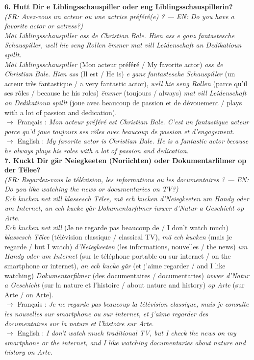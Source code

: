 \noindent\textbf{6. Hutt Dir e Liblingsschauspiller oder eng Liblingsschauspillerin?}\\
\textit{(FR: Avez-vous un acteur ou une actrice préféré(e) ? — EN: Do you have a favorite actor or actress?)}\\[0.3em]
\textit{Mäi Liblingsschauspiller ass de Christian Bale. Hien ass e ganz fantastesche Schauspiller, well hie seng Rollen ëmmer mat vill Leidenschaft an Dedikatioun spillt.}\\
\textit{Mäi Liblingsschauspiller} (Mon acteur préféré / My favorite actor) \textit{ass de Christian Bale}. \textit{Hien ass} (Il est / He is) \textit{e ganz fantastesche Schauspiller} (un acteur très fantastique / a very fantastic actor), \textit{well hie seng Rollen} (parce qu'il ses rôles / because he his roles) \textit{ëmmer} (toujours / always) \textit{mat vill Leidenschaft an Dedikatioun spillt} (joue avec beaucoup de passion et de dévouement / plays with a lot of passion and dedication).\\
$\rightarrow$ Français : \textit{Mon acteur préféré est Christian Bale. C'est un fantastique acteur parce qu'il joue toujours ses rôles avec beaucoup de passion et d'engagement.}\\
$\rightarrow$ English : \textit{My favorite actor is Christian Bale. He is a fantastic actor because he always plays his roles with a lot of passion and dedication.}\\[0.8em]

\noindent\textbf{7. Kuckt Dir gär Neiegkeeten (Noriichten) oder Dokumentarfilmer op der Tëlee?}\\
\textit{(FR: Regardez-vous la télévision, les informations ou les documentaires ? — EN: Do you like watching the news or documentaries on TV?)}\\[0.3em]
\textit{Ech kucken net vill klassesch Tëlee, mä ech kucken d'Neiegkeeten um Handy oder um Internet, an ech kucke gär Dokumentarfilmer iwwer d'Natur a Geschicht op Arte.}\\
\textit{Ech kucken net vill} (Je ne regarde pas beaucoup de / I don't watch much) \textit{klassesch Tëlee} (télévision classique / classical TV), \textit{mä ech kucken} (mais je regarde / but I watch) \textit{d'Neiegkeeten} (les informations, nouvelles / the news) \textit{um Handy oder um Internet} (sur le téléphone portable ou sur internet / on the smartphone or internet), \textit{an ech kucke gär} (et j'aime regarder / and I like watching) \textit{Dokumentarfilmer} (des documentaires / documentaries) \textit{iwwer d'Natur a Geschicht} (sur la nature et l'histoire / about nature and history) \textit{op Arte} (sur Arte / on Arte).\\
$\rightarrow$ Français : \textit{Je ne regarde pas beaucoup la télévision classique, mais je consulte les nouvelles sur smartphone ou sur internet, et j'aime regarder des documentaires sur la nature et l'histoire sur Arte.}\\
$\rightarrow$ English : \textit{I don't watch much traditional TV, but I check the news on my smartphone or the internet, and I like watching documentaries about nature and history on Arte.}\\[0.8em]

